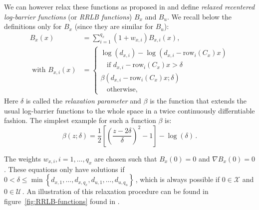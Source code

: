 \documentclass[conference]{IEEEtran}
\theoremstyle{definition}
\theoremstyle{remark}
\def\cal#1{\mathcal{#1}}
\def\rm#1{\mathrm{#1}}
\begin{document}
We can however relax these functions as proposed in \cite{RRLB-linear-MPC} and define \textit{relaxed recentered log-barrier functions} (or \textit{RRLB functions}) $B_x$ and $B_u$.
We recall below the definitions only for $B_x$ (since they are similar for $B_u$):
\begin{align}
	B_x(x)&=\sum_{i=1}^{q_x}(1+w_{x,i})B_{x,i}(x),\\
	\text{ with }B_{x,i}(x)&=\begin{cases}
		\log(d_{x,i})-\log(d_{x,i}-\rm{row}_i(C_x)x)\\
		~~~~\text{if }d_{x,i}-\rm{row}_i(C_x)x>\delta\\
		\beta(d_{x,i}-\rm{row}_i(C_x)x;\delta)\\
		~~~~\text{otherwise},
	\end{cases}
\end{align}
Here $\delta$ is called the \textit{relaxation parameter} and $\beta$ is the function that extends the usual log-barrier functions to the whole space in a twice continuously differntiable fashion.
The simplest example for such a function $\beta$ is:
\begin{equation}
	\label{eq:beta}
	\beta(z;\delta)=\frac{1}{2}\left[ \left( \frac{z-2\delta}{\delta} \right)^2-1 \right]-\log(\delta)\,.
\end{equation}

The weights $w_{x,i}, i=1,\dots,q_x$ are chosen such that $B_x(0)=0$ and $\nabla B_x(0)=0$.
These equations only have solutions if $0<\delta\leq\min\left\{d_{x,1},\ldots,d_{x,q_x},d_{u,1},\ldots,d_{u,q_u}\right\}$\,, which is always possible if $0\in\cal{X}$ and $0\in\cal{U}$\,.
An illustration of this relaxation procedure can be found in figure~\ref{fig:RRLB-functions} found in \cite{RRLB-linear-MPC}.
\end{document}
